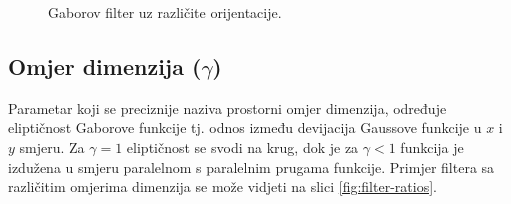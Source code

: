 \documentclass{article}
\begin{document}
\begin{figure}[h!tb]
\centering
{}
\hspace{50pt}
\caption{Gaborov filter uz različite orijentacije.}
\label{fig:filter-orientations}
\end{figure}


\subsection{Omjer dimenzija ($\gamma $)}
Parametar koji se preciznije naziva prostorni omjer dimenzija, određuje
eliptičnost Gaborove funkcije tj. odnos između devijacija Gaussove funkcije u
$x$ i $y$ smjeru. Za $\gamma = 1$ eliptičnost se svodi na krug, dok je za
$\gamma < 1$ funkcija je izdužena u smjeru paralelnom s paralelnim prugama
funkcije. Primjer filtera sa različitim omjerima dimenzija se može vidjeti na
slici \ref{fig:filter-ratios}.
\end{document}
